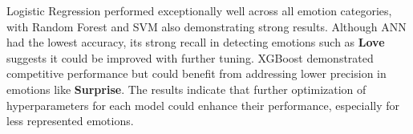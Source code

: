 Logistic Regression performed exceptionally well across all emotion categories, with Random Forest and SVM also demonstrating strong results. Although ANN had the lowest accuracy, its strong recall in detecting emotions such as \textbf{Love} suggests it could be improved with further tuning. XGBoost demonstrated competitive performance but could benefit from addressing lower precision in emotions like \textbf{Surprise}. The results indicate that further optimization of hyperparameters for each model could enhance their performance, especially for less represented emotions.
